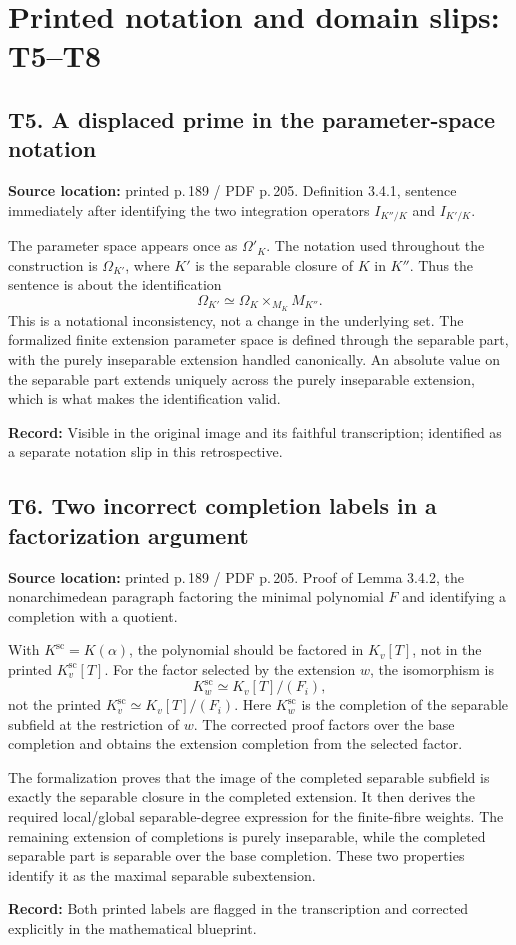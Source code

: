 \documentclass[10pt,a4paper]{article}
\newcommand{\loc}[2]{\textbf{Source location:} printed p.\,#1 / PDF p.\,#2.}
\newcommand{\hist}[1]{\par{\footnotesize\color{graytext}\textbf{Record:} #1}}
\begin{document}
\newpage
\section{Printed notation and domain slips: T5--T8}\label{t5}

\subsection{T5. A displaced prime in the parameter-space notation}
\loc{189}{205} Definition 3.4.1, sentence immediately after identifying
the two integration operators $I_{K''/K}$ and $I_{K'/K}$.

The parameter space appears once as $\Omega'_K$. The notation used
throughout the construction is $\Omega_{K'}$, where $K'$ is the
separable closure of $K$ in $K''$. Thus the sentence is about the
identification
\[
 \Omega_{K'}\simeq\Omega_K\times_{M_K}M_{K''}.
\]
This is a notational inconsistency, not a change in the underlying set.
The formalized finite extension parameter space is defined through the
separable part, with the purely inseparable extension handled canonically.
An absolute value on the separable part extends uniquely across the
purely inseparable extension, which is what makes the identification valid.
\hist{Visible in the original image and its faithful transcription;
identified as a separate notation slip in this retrospective.}

\subsection{T6. Two incorrect completion labels in a factorization argument}
\loc{189}{205} Proof of Lemma 3.4.2, the nonarchimedean paragraph
factoring the minimal polynomial $F$ and identifying a completion with a quotient.

With $K^{\mathrm{sc}}=K(\alpha)$, the polynomial should be factored in
\textbf{$K_v[T]$}, not in the printed $K_v^{\mathrm{sc}}[T]$.
For the factor selected by the extension $w$, the isomorphism is
\[
 K_w^{\mathrm{sc}}\simeq K_v[T]/(F_i),
\]
not the printed $K_v^{\mathrm{sc}}\simeq K_v[T]/(F_i)$.
Here $K_w^{\mathrm{sc}}$ is the completion of the separable subfield
at the restriction of $w$. The corrected proof factors over the base
completion and obtains the extension completion from the selected factor.

The formalization proves that the image of the completed separable
subfield is exactly the separable closure in the completed extension.
It then derives the required local/global separable-degree expression
for the finite-fibre weights.
The remaining extension of completions is purely inseparable, while
the completed separable part is separable over the base completion.
These two properties identify it as the maximal separable subextension.
\hist{Both printed labels are flagged in the transcription and corrected
explicitly in the mathematical blueprint.}
\end{document}
